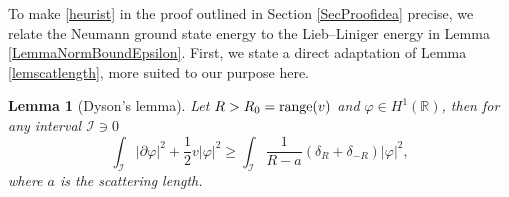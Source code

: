 \documentclass[a4paper,11pt]{article}
\newcommand{\abs}[1]{\left\lvert #1 \right\rvert}
\newcommand{\R}{\mathbb{R}}
\newtheorem{lemma}[theorem]{Lemma}
\numberwithin{equation}{section}
\begin{document}
	To make \eqref{heurist} in the proof outlined in Section \ref{SecProofidea} precise, we relate the Neumann ground state energy to the Lieb--Liniger energy in Lemma \ref{LemmaNormBoundEpsilon}. First, we state a direct adaptation of Lemma \ref{lemscatlength}, more suited to our purpose here. 
	
	\begin{lemma}[Dyson's lemma]\label{LemmaDyson} Let $ R>R_0=\textnormal{range}(v) $ and $ \varphi\in H^1(\R) $, then for any interval $ \mathcal{I}\ni 0 $ 
		\begin{equation}
		\int_{\mathcal{I}} \abs{\partial \varphi}^2+\frac12 v\abs{\varphi}^2\geq \int_{\mathcal{I}}\frac{1}{R-a}\left(\delta_R+\delta_{-R}\right)\abs{\varphi}^2,
		\end{equation}
		where $ a $ is the scattering length.
	\end{lemma}
	
	
	
\end{document}
